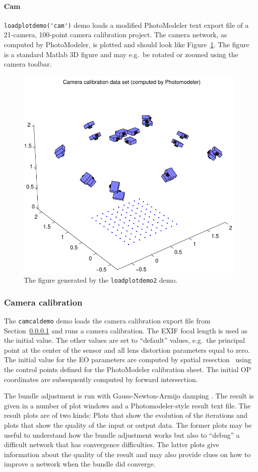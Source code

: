 \documentclass{article}
\begin{document}
\paragraph{\sc Cam}
\label{sec:camcaldata}
\verb+loadplotdemo('cam')+ demo loads a modified PhotoModeler text
export file of a 21-camera, 100-point camera calibration project. The
camera network, as computed by PhotoModeler, is plotted and should
look like Figure~\ref{fig:camcalib}. The figure is a standard Matlab
3D figure and may e.g.\ be rotated or zoomed using the camera toolbar.

\begin{figure}
  \centering
  \includegraphics[width=0.45\hsize]{ill/ccam}
  \caption{The figure generated by the \texttt{loadplotdemo2} demo.}
  \label{fig:camcalib}
\end{figure}

\subsubsection{Camera calibration}

The \verb+camcaldemo+ demo loads the camera calibration export file
from Section~\ref{sec:camcaldata} and runs a camera calibration. The
EXIF focal length is used as the initial value. The other values are
set to ``default'' values, e.g.\ the principal point at the center of
the sensor and all lens distortion parameters equal to zero. The
initial value for the EO parameters are computed by spatial
resection~\citep[Chap.~11.1.3.4]{Haralick1994:Review,McGlone2004:Manual} using
the control points defined for the PhotoModeler calibration sheet. The
initial OP coordinates are subsequently computed by forward
intersection.

The bundle adjustment is run with Gauss-Newton-Armijo damping
\citep{Borlin2013:Bundle}. The result is given in a number of plot
windows and a Photo\-modeler-style result text file. The result plots
are of two kinds: Plots that show the evolution of the iterations and
plots that show the quality of the input or output data. The former
plots may be useful to understand how the bundle adjustment works but
also to ``debug'' a difficult network that has convergence
difficulties. The latter plots give information about the quality of
the result and may also provide clues on how to improve a network when
the bundle did converge.
\end{document}
